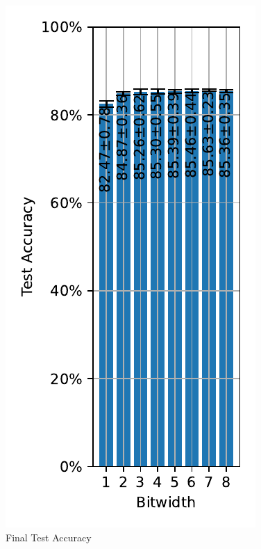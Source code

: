         \begin{figure}[H]
            \centering
            \includegraphics[width=\textwidth]{../standard/FashionMNIST/plots/fashionmnist_final_acc.pdf}
            \caption{Final Test Accuracy}
        \end{figure}

